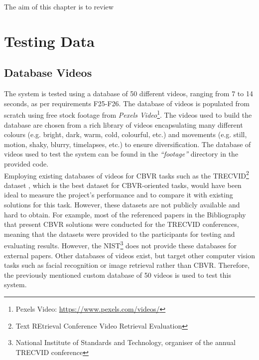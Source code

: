 The aim of this chapter is to review


\section{Testing Data}

\subsection{Database Videos}

The system is tested using a database of 50 different videos, ranging from 7 to 14 seconds, as per requirements F25-F26. The database of videos is populated from scratch using free stock footage from \textit{Pexels Video}\footnote{Pexels Video: \url{https://www.pexels.com/videos/}}. The videos used to build the database are chosen from a rich library of videos encapsulating many different colours (e.g. bright, dark, warm, cold, colourful, etc.) and movements (e.g. still, motion, shaky, blurry, timelapses, etc.) to ensure diversification. The database of videos used to test the system can be found in the \textit{``footage''} directory in the provided code.\\

Employing existing databases of videos for CBVR tasks such as the TRECVID\footnote{Text REtrieval Conference Video Retrieval Evaluation} dataset \cite{2018trecvidawad}, which is the best dataset for CBVR-oriented tasks, would have been ideal to measure the project's performance and to compare it with existing solutions for this task. However, these datasets are not publicly available and hard to obtain. For example, most of the referenced papers in the Bibliography that present CBVR solutions were conducted for the TRECVID conferences, meaning that the datasets were provided to the participants for testing and evaluating results. However, the NIST\footnote{National Institute of Standards and Technology, organiser of the annual TRECVID conference} does not provide these databases for external papers. Other databases of videos exist, but target other computer vision tasks such as facial recognition or image retrieval rather than CBVR. Therefore, the previously mentioned custom database of 50 videos is used to test this system.\\


